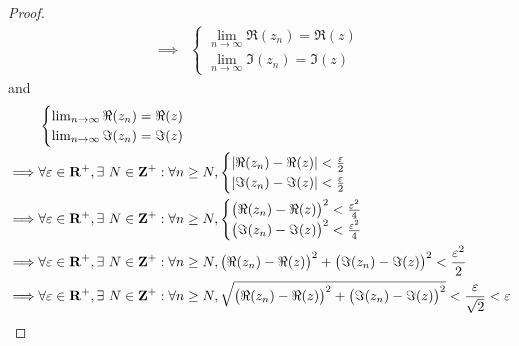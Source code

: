 \begin{proof}
\begin{align*}
        \implies & \begin{cases}
                       \lim_{n \to \infty} \Re(z_n) = \Re(z) \\
                       \lim_{n \to \infty} \Im(z_n) = \Im(z)
                   \end{cases}
    \end{align*}
    and
    \begin{align*}
                 & \begin{cases}
                       \lim_{n \to \infty} \Re(z_n) = \Re(z) \\
                       \lim_{n \to \infty} \Im(z_n) = \Im(z)
                   \end{cases}                                                                                                                                                   \\
        \implies & \forall \varepsilon \in \R^+, \exists\ N \in \Z^+ : \forall n \geq N, \begin{cases}
                                                                                             \abs{\Re(z_n) - \Re(z)} < \frac{\varepsilon}{2} \\
                                                                                             \abs{\Im(z_n) - \Im(z)} < \frac{\varepsilon}{2}
                                                                                         \end{cases}                                                                   \\
        \implies & \forall \varepsilon \in \R^+, \exists\ N \in \Z^+ : \forall n \geq N, \begin{cases}
                                                                                             \big(\Re(z_n) - \Re(z)\big)^2 < \frac{\varepsilon^2}{4} \\
                                                                                             \big(\Im(z_n) - \Im(z)\big)^2 < \frac{\varepsilon^2}{4}
                                                                                         \end{cases}                           \\
        \implies & \forall \varepsilon \in \R^+, \exists\ N \in \Z^+ : \forall n \geq N, \big(\Re(z_n) - \Re(z)\big)^2 + \big(\Im(z_n) - \Im(z)\big)^2 < \frac{\varepsilon^2}{2}                           \\
        \implies & \forall \varepsilon \in \R^+, \exists\ N \in \Z^+ : \forall n \geq N, \sqrt{\big(\Re(z_n) - \Re(z)\big)^2 + \big(\Im(z_n) - \Im(z)\big)^2} < \frac{\varepsilon}{\sqrt{2}} < \varepsilon \\

\end{align*}
\end{proof}
